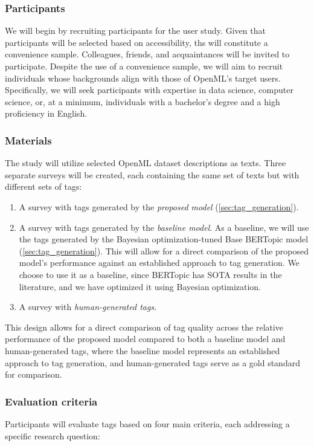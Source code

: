 \subsubsection{Participants}
We will begin by recruiting participants for the user study. Given that participants will be selected based on accessibility, ths will constitute a convenience sample. Colleagues, friends, and acquaintances will be invited to participate. Despite the use of a convenience sample, we will aim to recruit individuals whose backgrounds align with those of OpenML's target users. Specifically, we will seek participants with expertise in data science, computer science, or, at a minimum, individuals with a bachelor's degree and a high proficiency in English.

\subsubsection{Materials}
The study will utilize selected OpenML dataset descriptions as texts. Three separate surveys will be created, each containing the same set of texts but with different sets of tags:

\begin{enumerate}
\item A survey with tags generated by the \textit{proposed model} (\cref{sec:tag_generation}).
\item A survey with tags generated by the \textit{baseline model}. As a baseline, we will use the tags generated by the Bayesian optimization-tuned Base BERTopic model (\cref{sec:tag_generation}). This will allow for a direct comparison of the proposed model's performance against an established approach to tag generation. We choose to use it as a baseline, since BERTopic has SOTA results in the literature, and we have optimized it using Bayesian optimization.
\item A survey with \textit{human-generated tags}.
\end{enumerate}

This design allows for a direct comparison of tag quality across the relative performance of the proposed model compared to both a baseline model and human-generated tags, where the baseline model represents an established approach to tag generation, and human-generated tags serve as a gold standard for comparison.

\subsubsection{Evaluation criteria}
Participants will evaluate tags based on four main criteria, each addressing a specific research question:

